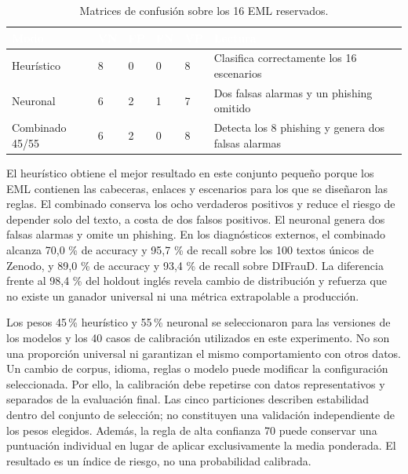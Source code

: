 \documentclass[11pt,a4paper,oneside]{report}
\begin{document}
\begingroup
\begin{table}[H]
  \centering
  \small
  \caption{Matrices de confusión sobre los 16 EML reservados.}
  \label{tab:6-4}
  \begin{tabularx}{\textwidth}{|X|X|X|X|X|X|}
    \hline
    \rowcolor{uemcgreen}
    \textcolor{white}{\textbf{Modo}} & \textcolor{white}{\textbf{VN}} & \textcolor{white}{\textbf{FP}} & \textcolor{white}{\textbf{FN}} & \textcolor{white}{\textbf{VP}} & \textcolor{white}{\textbf{Lectura}} \\
    \hline
    Heurístico & 8 & 0 & 0 & 8 & Clasifica correctamente los 16 escenarios \\
    \hline
    \rowcolor{tablelight}
    Neuronal & 6 & 2 & 1 & 7 & Dos falsas alarmas y un phishing omitido \\
    \hline
    Combinado 45/55 & 6 & 2 & 0 & 8 & Detecta los 8 phishing y genera dos falsas alarmas \\
    \hline
  \end{tabularx}
\end{table}
\endgroup

El heurístico obtiene el mejor resultado en este conjunto pequeño porque los EML contienen las cabeceras, enlaces y escenarios para los que se diseñaron las reglas. El combinado conserva los ocho verdaderos positivos y reduce el riesgo de depender solo del texto, a costa de dos falsos positivos. El neuronal genera dos falsas alarmas y omite un phishing. En los diagnósticos externos, el combinado alcanza 70,0 \% de accuracy y 95,7 \% de recall sobre los 100 textos únicos de Zenodo, y 89,0 \% de accuracy y 93,4 \% de recall sobre DIFrauD. La diferencia frente al 98,4 \% del holdout inglés revela cambio de distribución y refuerza que no existe un ganador universal ni una métrica extrapolable a producción.

Los pesos 45\,\% heurístico y 55\,\% neuronal se seleccionaron para las versiones de los modelos y los 40 casos de calibración utilizados en este experimento. No son una proporción universal ni garantizan el mismo comportamiento con otros datos. Un cambio de corpus, idioma, reglas o modelo puede modificar la configuración seleccionada. Por ello, la calibración debe repetirse con datos representativos y separados de la evaluación final. Las cinco particiones describen estabilidad dentro del conjunto de selección; no constituyen una validación independiente de los pesos elegidos. Además, la regla de alta confianza 70 puede conservar una puntuación individual en lugar de aplicar exclusivamente la media ponderada. El resultado es un índice de riesgo, no una probabilidad calibrada.
\end{document}
